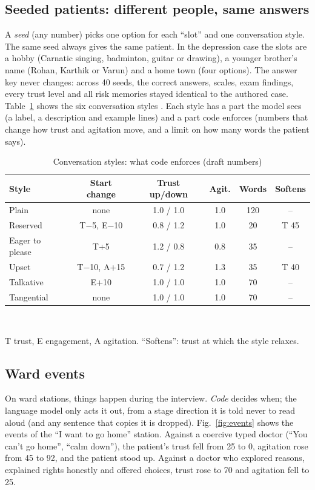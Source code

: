 \documentclass[journal]{IEEEtran}
\begin{document}
\subsection{Seeded patients: different people, same answers}
A \emph{seed} (any number) picks one option for each ``slot'' and one conversation style. The same seed always gives the same patient. In the
depression case the slots are a hobby (Carnatic singing, badminton, guitar or drawing), a younger brother's name (Rohan, Karthik or Varun) and a home
town (four options). The answer key never changes: across 40 seeds, the correct answers, scales, exam findings, every trust level and all risk
memories stayed identical to the authored case. Table~\ref{tab:styles} shows the six conversation styles \cite{wang2024patient}. Each style has a
part the model sees (a label, a description and example lines) and a part code enforces (numbers that change how trust and agitation move, and a
limit on how many words the patient says).

\begin{table}[t]
\caption{Conversation styles: what code enforces (draft numbers)}
\label{tab:styles}
\centering
\scriptsize
\begin{tabular}{@{}lccccc@{}}
\toprule
Style & Start change & Trust up/down & Agit. & Words & Softens\\
\midrule
Plain & none & 1.0 / 1.0 & 1.0 & 120 & --\\
Reserved & T$-$5, E$-$10 & 0.8 / 1.2 & 1.0 & 20 & T 45\\
Eager to please & T+5 & 1.2 / 0.8 & 0.8 & 35 & --\\
Upset & T$-$10, A+15 & 0.7 / 1.2 & 1.3 & 35 & T 40\\
Talkative & E+10 & 1.0 / 1.0 & 1.0 & 70 & --\\
Tangential & none & 1.0 / 1.0 & 1.0 & 70 & --\\
\bottomrule
\end{tabular}
\\[1mm]\raggedright\scriptsize T trust, E engagement, A agitation. ``Softens'': trust at which the style relaxes.
\end{table}

\subsection{Ward events}
On ward stations, things happen during the interview. \emph{Code} decides when; the language model only acts it out, from a stage direction it is
told never to read aloud (and any sentence that copies it is dropped). Fig.~\ref{fig:events} shows the events of the ``I want to go home''
station. Against a coercive typed doctor (``You can't go home'', ``calm down''), the patient's trust fell from 25 to 0, agitation rose from 45 to 92, and the patient stood up. Against a doctor who explored reasons, explained rights honestly and offered choices, trust rose to 70 and agitation fell to 25.
\end{document}
